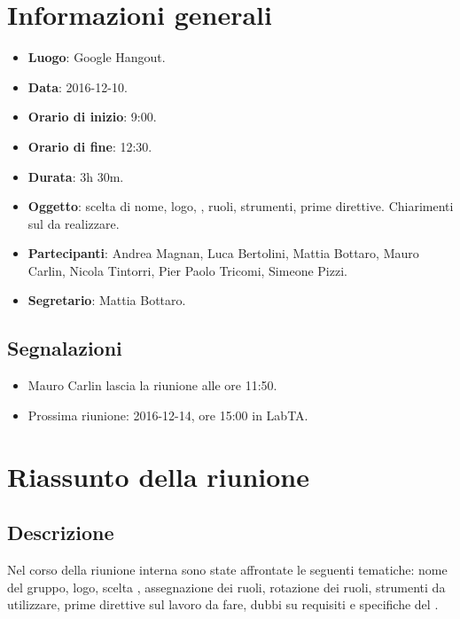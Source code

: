 \documentclass[a4paper,titlepage]{article}
\begin{document}
\maketitle
\begin{diario}
\end{diario}
\newpage
\tableofcontents

\newpage
\section{Informazioni generali}
\label{sec:Informazioni}

\begin{itemize}
  \item \textbf{Luogo}: Google Hangout.
  \item \textbf{Data}: 2016-12-10.
  \item \textbf{Orario di inizio}: 9:00.
  \item \textbf{Orario di fine}: 12:30.
  \item \textbf{Durata}: 3h 30m.
  \item \textbf{Oggetto}: scelta di nome, logo, , ruoli, strumenti, prime direttive. Chiarimenti sul  da realizzare. 
  \item \textbf{Partecipanti}: Andrea Magnan, Luca Bertolini, Mattia Bottaro, Mauro Carlin, Nicola Tintorri, Pier Paolo Tricomi, Simeone Pizzi.
  \item \textbf{Segretario}: Mattia Bottaro.
  
\end{itemize}
\subsection{Segnalazioni}
\begin{itemize}
 \item Mauro Carlin lascia la riunione alle ore 11:50.
 \item Prossima riunione: 2016-12-14, ore 15:00 in LabTA. 
\end{itemize}
\section{Riassunto della riunione}
\label{sec:RiassuntoRiunione}
 \subsection{Descrizione}
 Nel corso della riunione interna sono state affrontate le seguenti tematiche: nome del gruppo, logo, scelta , assegnazione dei ruoli, rotazione dei ruoli, strumenti da utilizzare, prime direttive sul lavoro da fare, dubbi su requisiti e specifiche del .
\end{document}
